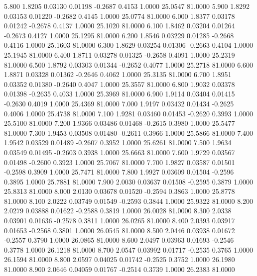    5.800   1.8205   0.03130   0.01198  -0.2687   0.4153   1.0000  25.0547  81.0000
   5.900   1.8292   0.03153   0.01220  -0.2682   0.4145   1.0000  25.0774  81.0000
   6.000   1.8377   0.03178   0.01242  -0.2678   0.4137   1.0000  25.1020  81.0000
   6.100   1.8462   0.03204   0.01264  -0.2673   0.4127   1.0000  25.1295  81.0000
   6.200   1.8546   0.03229   0.01285  -0.2668   0.4116   1.0000  25.1603  81.0000
   6.300   1.8629   0.03254   0.01306  -0.2663   0.4104   1.0000  25.1945  81.0000
   6.400   1.8711   0.03278   0.01325  -0.2658   0.4091   1.0000  25.2319  81.0000
   6.500   1.8792   0.03303   0.01344  -0.2652   0.4077   1.0000  25.2718  81.0000
   6.600   1.8871   0.03328   0.01362  -0.2646   0.4062   1.0000  25.3135  81.0000
   6.700   1.8951   0.03352   0.01380  -0.2640   0.4047   1.0000  25.3557  81.0000
   6.800   1.9032   0.03378   0.01398  -0.2635   0.4033   1.0000  25.3969  81.0000
   6.900   1.9114   0.03404   0.01415  -0.2630   0.4019   1.0000  25.4369  81.0000
   7.000   1.9197   0.03432   0.01434  -0.2625   0.4006   1.0000  25.4738  81.0000
   7.100   1.9281   0.03460   0.01453  -0.2620   0.3993   1.0000  25.5100  81.0000
   7.200   1.9366   0.03486   0.01468  -0.2615   0.3980   1.0000  25.5477  81.0000
   7.300   1.9453   0.03508   0.01480  -0.2611   0.3966   1.0000  25.5866  81.0000
   7.400   1.9542   0.03529   0.01489  -0.2607   0.3952   1.0000  25.6261  81.0000
   7.500   1.9634   0.03549   0.01495  -0.2603   0.3938   1.0000  25.6663  81.0000
   7.600   1.9729   0.03567   0.01498  -0.2600   0.3923   1.0000  25.7067  81.0000
   7.700   1.9827   0.03587   0.01501  -0.2598   0.3909   1.0000  25.7471  81.0000
   7.800   1.9927   0.03609   0.01504  -0.2596   0.3895   1.0000  25.7881  81.0000
   7.900   2.0030   0.03637   0.01508  -0.2595   0.3879   1.0000  25.8313  81.0000
   8.000   2.0130   0.03678   0.01520  -0.2594   0.3863   1.0000  25.8778  81.0000
   8.100   2.0222   0.03749   0.01549  -0.2593   0.3844   1.0000  25.9322  81.0000
   8.200   2.0279   0.03888   0.01622  -0.2588   0.3819   1.0000  26.0028  81.0000
   8.300   2.0338   0.03901   0.01636  -0.2578   0.3811   1.0000  26.0265  81.0000
   8.400   2.0393   0.03917   0.01653  -0.2568   0.3801   1.0000  26.0545  81.0000
   8.500   2.0446   0.03938   0.01672  -0.2557   0.3790   1.0000  26.0865  81.0000
   8.600   2.0497   0.03963   0.01693  -0.2546   0.3778   1.0000  26.1218  81.0000
   8.700   2.0547   0.03992   0.01717  -0.2535   0.3765   1.0000  26.1594  81.0000
   8.800   2.0597   0.04025   0.01742  -0.2525   0.3752   1.0000  26.1980  81.0000
   8.900   2.0646   0.04059   0.01767  -0.2514   0.3739   1.0000  26.2383  81.0000
